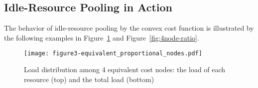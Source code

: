 \subsection{Idle-Resource Pooling in Action}

The behavior of idle-resource pooling by the convex cost function is
illustrated by the following examples in Figure~\ref{fig:4node} and
Figure~\ref{fig:4node-ratio}.

\begin{figure}[tb]
  \begin{center}
    \texttt{[image: figure3-equivalent\_proportional\_nodes.pdf]}
    \vspace{-2.0ex}
    \caption{Load distribution among 4 equivalent cost nodes:
      the load of each resource (top) and the total load (bottom)}
    \label{fig:4node}
  \end{center}
  \hspace{0.8\columnsep}
\end{figure}

